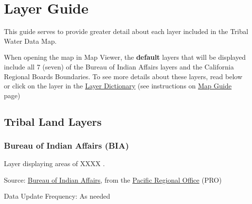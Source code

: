 \documentclass[
  letterpaper,
  DIV=11,
  numbers=noendperiod]{scrreprt}
\begin{document}

\chapter{Layer Guide}\label{layer-guide}

This guide serves to provide greater detail about each layer included in
the Tribal Water Data Map.

\begin{tcolorbox}[enhanced jigsaw, breakable, title=\textcolor{quarto-callout-note-color}{\faInfo}\hspace{0.5em}{Note on default map settings}, coltitle=black, colframe=quarto-callout-note-color-frame, opacitybacktitle=0.6, colback=white, opacityback=0, bottomrule=.15mm, colbacktitle=quarto-callout-note-color!10!white, leftrule=.75mm, bottomtitle=1mm, toptitle=1mm, toprule=.15mm, left=2mm, titlerule=0mm, arc=.35mm, rightrule=.15mm]

When opening the map in Map Viewer, the \textbf{default} layers that
will be displayed include all 7 (seven) of the Bureau of Indian Affairs
layers and the California Regional Boards Boundaries. To see more
details about these layers, read below or click on the layer in the
\href{https://gispublic.waterboards.ca.gov/portal/home/item.html?id=16e2736dbf924effbbab3c771bf569fd}{Layer
Dictionary} (see instructions on
\href{https://cawaterboarddatacenter.github.io/tribal-water-data-map-manual/map-guide.html}{Map
Guide} page)

\end{tcolorbox}

\section{Tribal Land Layers}\label{tribal-land-layers}

\subsection{Bureau of Indian Affairs
(BIA)}\label{bureau-of-indian-affairs-bia}

Layer displaying areas of XXXX .

Source:
\href{https://www.bia.gov/sites/default/files/dup/assets/bia/pacreg/PRO_Indian_Lands.gdb_.zip}{Bureau
of Indian Affairs}, from the
\href{https://www.bia.gov/regional-offices/pacific}{Pacific Regional
Office} (PRO)

Data Update Frequency: As needed
\end{document}

